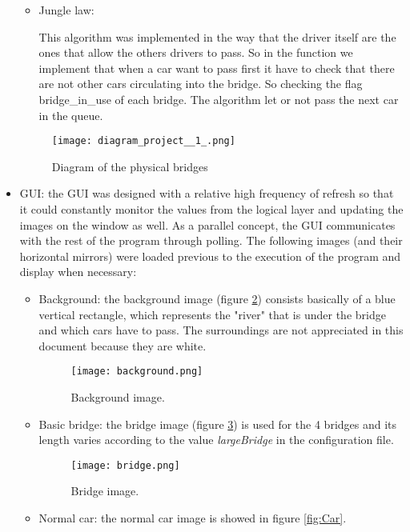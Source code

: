 \documentclass[a4paper,9pt]{article}
\begin{document}
\begin{itemize}
\begin{itemize}
\item Jungle law:

This algorithm was implemented in the way that the driver itself are the ones that allow the others drivers to pass. So in the function we implement that when a car want to pass first it have to check that there are not other cars circulating into the bridge. So checking the flag bridge\_in\_use of each bridge. The algorithm let or not pass the next car in the queue. 

\end{itemize}

\begin{figure}[H]
\centering
\texttt{[image: diagram\_project\_\_1\_.png]}
\caption{Diagram of the physical bridges }
\label{diagBridges}
 \end{figure} \bigskip


\item GUI: the GUI was designed with a relative high frequency of refresh so that it could constantly monitor the values from the logical layer and updating the images on the window as well. As a parallel concept, the GUI communicates with the rest of the program through polling. The following images (and their horizontal mirrors) were loaded previous to the execution of the program and display when necessary:
\begin{itemize}
\item Background: the background image (figure \ref{fig:background}) consists basically of a blue vertical rectangle, which represents the "river" that is under the bridge and which cars have to pass. The surroundings are not appreciated in this document because they are white.

\begin{figure}[H]
\centering
\texttt{[image: background.png]}
\caption{Background image.}
\label{fig:background}
 \end{figure} \bigskip

\item Basic bridge: the bridge image (figure \ref{fig:bridge}) is used for the 4 bridges and its length varies according to the value \emph{largeBridge} in the configuration file. 

\begin{figure}[H]
\centering
\texttt{[image: bridge.png]}
\caption{Bridge image.}
\label{fig:bridge}
 \end{figure} \bigskip

\item Normal car: the normal car image is showed in figure \ref{fig:Car}.


\end{itemize}
\end{itemize}
\end{document}
